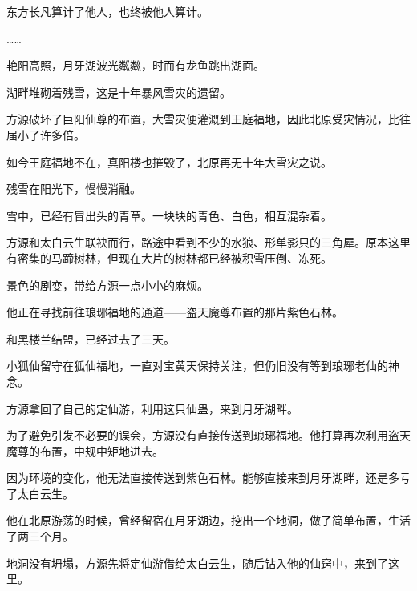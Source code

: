 \begin{this_body}
东方长凡算计了他人，也终被他人算计。

……

艳阳高照，月牙湖波光粼粼，时而有龙鱼跳出湖面。

湖畔堆砌着残雪，这是十年暴风雪灾的遗留。

方源破坏了巨阳仙尊的布置，大雪灾便灌溉到王庭福地，因此北原受灾情况，比往届小了许多倍。

如今王庭福地不在，真阳楼也摧毁了，北原再无十年大雪灾之说。

残雪在阳光下，慢慢消融。

雪中，已经有冒出头的青草。一块块的青色、白色，相互混杂着。

方源和太白云生联袂而行，路途中看到不少的水狼、形单影只的三角犀。原本这里有密集的马蹄树林，但现在大片的树林都已经被积雪压倒、冻死。

景色的剧变，带给方源一点小小的麻烦。

他正在寻找前往琅琊福地的通道——盗天魔尊布置的那片紫色石林。

和黑楼兰结盟，已经过去了三天。

小狐仙留守在狐仙福地，一直对宝黄天保持关注，但仍旧没有等到琅琊老仙的神念。

方源拿回了自己的定仙游，利用这只仙蛊，来到月牙湖畔。

为了避免引发不必要的误会，方源没有直接传送到琅琊福地。他打算再次利用盗天魔尊的布置，中规中矩地进去。

因为环境的变化，他无法直接传送到紫色石林。能够直接来到月牙湖畔，还是多亏了太白云生。

他在北原游荡的时候，曾经留宿在月牙湖边，挖出一个地洞，做了简单布置，生活了两三个月。

地洞没有坍塌，方源先将定仙游借给太白云生，随后钻入他的仙窍中，来到了这里。

\end{this_body}

